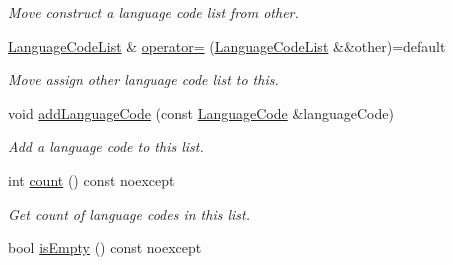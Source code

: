 \begin{DoxyCompactItemize}
\begin{DoxyCompactList}\small\item\em Move construct a language code list from {\itshape other}. \end{DoxyCompactList}\item 
\hyperlink{class_mdt_1_1_translation_1_1_language_code_list}{Language\+Code\+List} \& \hyperlink{class_mdt_1_1_translation_1_1_language_code_list_ace445e0f112d205a700fb771122eaeeb}{operator=} (\hyperlink{class_mdt_1_1_translation_1_1_language_code_list}{Language\+Code\+List} \&\&other)=default\hypertarget{class_mdt_1_1_translation_1_1_language_code_list_ace445e0f112d205a700fb771122eaeeb}{}\label{class_mdt_1_1_translation_1_1_language_code_list_ace445e0f112d205a700fb771122eaeeb}

\begin{DoxyCompactList}\small\item\em Move assign {\itshape other} language code list to this. \end{DoxyCompactList}\item 
void \hyperlink{class_mdt_1_1_translation_1_1_language_code_list_a48e456cb4e11e1ce78ea2f65a4d79dfb}{add\+Language\+Code} (const \hyperlink{class_mdt_1_1_translation_1_1_language_code}{Language\+Code} \&language\+Code)
\begin{DoxyCompactList}\small\item\em Add a language code to this list. \end{DoxyCompactList}\item 
int \hyperlink{class_mdt_1_1_translation_1_1_language_code_list_a8d0ea98a3f91137c6c28a2445d640f1f}{count} () const noexcept\hypertarget{class_mdt_1_1_translation_1_1_language_code_list_a8d0ea98a3f91137c6c28a2445d640f1f}{}\label{class_mdt_1_1_translation_1_1_language_code_list_a8d0ea98a3f91137c6c28a2445d640f1f}

\begin{DoxyCompactList}\small\item\em Get count of language codes in this list. \end{DoxyCompactList}\item 
bool \hyperlink{class_mdt_1_1_translation_1_1_language_code_list_a7ba709dd4e4a312c5e17cb13e8ce61f4}{is\+Empty} () const noexcept\hypertarget{class_mdt_1_1_translation_1_1_language_code_list_a7ba709dd4e4a312c5e17cb13e8ce61f4}{}\label{class_mdt_1_1_translation_1_1_language_code_list_a7ba709dd4e4a312c5e17cb13e8ce61f4}


\end{DoxyCompactItemize}
